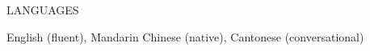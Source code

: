 \documentclass{resume} %
\begin{document}
\begin{rSection}{LANGUAGES}

\item English (fluent), Mandarin Chinese (native), Cantonese (conversational)
\end{rSection}
\end{document}
